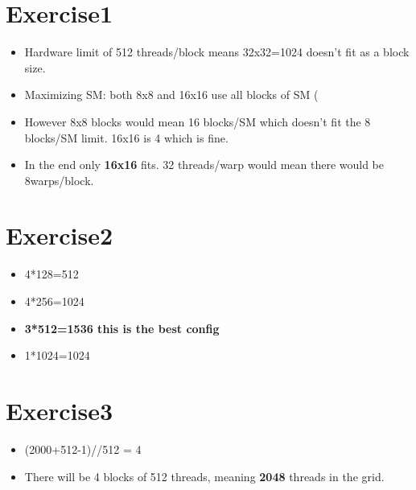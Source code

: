 \documentclass{report}
\begin{document}
\section{Exercise1}
\begin{itemize}
    \item Hardware limit of 512 threads/block means 32x32=1024 doesn't fit as a block size.
    \item Maximizing SM: both 8x8 and 16x16 use all blocks of SM (%
    \item However 8x8 blocks would mean 16 blocks/SM which doesn't fit the 8 blocks/SM limit. 16x16 is 4 which is fine.
    \item In the end only \textbf{16x16} fits. 32 threads/warp would mean there would be 8warps/block.
\end{itemize}


\section{Exercise2}
\begin{itemize}
    \item 4*128=512
    \item 4*256=1024
    \item \textbf{3*512=1536 this is the best config}
    \item 1*1024=1024
\end{itemize}


\section{Exercise3}
\begin{itemize}
    \item (2000+512-1)//512 = 4
    \item There will be 4 blocks of 512 threads, meaning \textbf{2048} threads in the grid.
\end{itemize}
\end{document}
